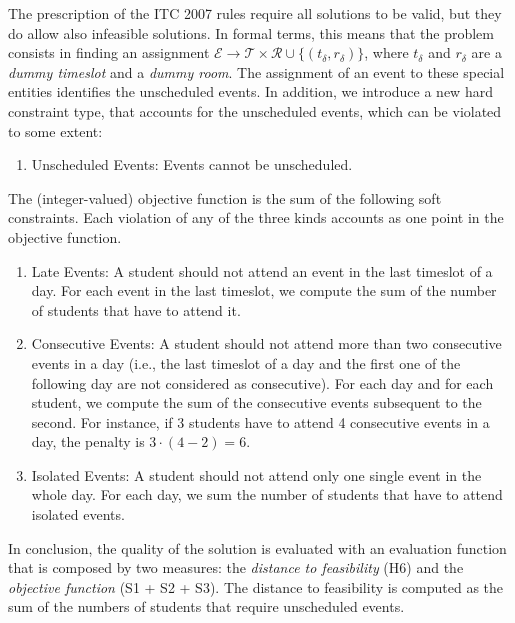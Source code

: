 \documentclass[authoryear,preprint,a4paper,12pt]{elsarticle}
\begin{document}
The prescription of the ITC 2007 rules require all solutions to be
valid, but they do allow also infeasible solutions.  In formal terms,
this means that the problem consists in finding an assignment
$\mathcal{E} \rightarrow \mathcal{T} \times \mathcal{R} \cup
\{(t_{\delta}, r_{\delta})\}$, where $t_\delta$ and $r_\delta$ are a
\emph{dummy timeslot} and a \emph{dummy room}. The assignment of an
event to these special entities identifies the unscheduled events. In
addition, we introduce a new hard constraint type, that accounts for
the unscheduled events, which can be violated to some extent:

\begin{enumerate}[H6.]
\item \textsf{Unscheduled Events:} Events cannot be
  unscheduled.\label{con:unscheduled}
\end{enumerate}

The (integer-valued) objective function is the sum
of the following soft constraints. Each violation of any of
the three kinds accounts as one point in the objective function.

\begin{enumerate}[S1.]
\item \textsf{Late Events:} A student should not attend an event in
  the last timeslot of a day. For each event in the last timeslot, we
  compute the sum of the number of students that have to attend
  it.\label{obj:late-event}
\item \textsf{Consecutive Events:} A student should not attend more
  than two consecutive events in a day (i.e., the last timeslot of a
  day and the first one of the following day are not considered as
  consecutive). For each day and for each student, we compute the sum
  of the consecutive events subsequent to the second.  For instance,
  if 3 students have to attend 4 consecutive events in a day, the penalty is
  $3\cdot(4-2) = 6$.  \label{obj:consecutive-event}
\item \textsf{Isolated Events:} A student should not attend only one
  single event in the whole day. For each day, we sum the number of
  students that have to attend isolated
  events.\label{obj:isolated-event}
\end{enumerate}

In conclusion, the quality of the solution is evaluated with an
evaluation function that is composed by two measures: the
\emph{distance to feasibility} (H6) and the \emph{objective function}
(S1 + S2 + S3). The distance to feasibility is computed as the sum of
the numbers of students that require unscheduled events.
\end{document}
